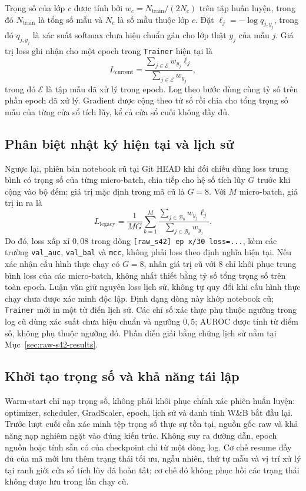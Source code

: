 \documentclass[14pt,a4paper,oneside]{extreport}
\begin{document}
Trọng số của lớp $c$ được tính bởi $w_c=N_{\mathrm{train}}/(2N_c)$
trên tập huấn luyện, trong đó $N_{\mathrm{train}}$ là tổng số mẫu và $N_c$ là số
mẫu thuộc lớp $c$. Đặt $\ell_j=-\log q_{j,y_j}$, trong đó $q_{j,y_j}$
là xác suất softmax chưa hiệu chuẩn gán cho lớp thật $y_j$ của mẫu $j$.
Giá trị loss ghi nhận cho một epoch trong
\texttt{Trainer} hiện tại là
\begin{equation}
 L_{\mathrm{current}}=
 \frac{\sum_{j\in\mathcal E}w_{y_j}\ell_j}{\sum_{j\in\mathcal E}w_{y_j}},
\end{equation}
trong đó $\mathcal E$ là tập mẫu đã xử lý trong epoch. Log theo bước
dùng cùng tỷ số trên phần epoch đã xử lý. Gradient được cộng theo
tử số rồi chia cho tổng trọng số mẫu của từng cửa sổ tích lũy, kể cả
cửa sổ cuối không đầy đủ.

\subsection{Phân biệt nhật ký hiện tại và lịch sử}
Ngược lại, phiên bản notebook cũ tại Git HEAD khi đối chiếu dùng loss trung bình có trọng số
của từng micro-batch, chia tiếp cho hệ số tích lũy $G$ trước khi cộng
vào bộ đếm; giá trị mặc định trong mã cũ là $G=8$.
Với $M$ micro-batch, giá trị in ra là
\begin{equation}
 L_{\mathrm{legacy}}=\frac{1}{MG}\sum_{b=1}^{M}
 \frac{\sum_{j\in\mathcal B_b}w_{y_j}\ell_j}
      {\sum_{j\in\mathcal B_b}w_{y_j}}.
\end{equation}
Do đó, loss xấp xỉ $0{,}08$ trong dòng
\texttt{[raw\_s42] ep x/30 loss=...}, kèm các trường
\texttt{val\_auc}, \texttt{val\_bal} và \texttt{mcc},
không phải loss theo định nghĩa hiện tại. Nếu xác nhận cấu hình thực
chạy có $G=8$, nhân giá trị cũ với 8 chỉ khôi phục trung bình loss của
các micro-batch, không nhất thiết bằng tỷ số tổng trọng số trên toàn
epoch. Luận văn giữ nguyên loss lịch sử, không tự quy đổi khi cấu hình
thực chạy chưa được xác minh độc lập. Định dạng dòng này khớp notebook
cũ; \texttt{Trainer} mới in một từ điển lịch sử. Các chỉ số xác thực
phụ thuộc ngưỡng trong log cũ dùng xác suất chưa hiệu chuẩn và ngưỡng
$0{,}5$; AUROC được tính từ điểm số, không phụ thuộc ngưỡng đó.
Phần diễn giải bằng chứng lịch sử nằm tại Mục~\ref{sec:raw-s42-results}.

\subsection{Khởi tạo trọng số và khả năng tái lập}
Warm-start chỉ nạp trọng số, không phải khôi phục chính xác phiên
huấn luyện: optimizer, scheduler, GradScaler, epoch, lịch sử và danh
tính W\&B bắt đầu lại. Trước lượt cuối cần xác minh tệp trọng số thực
sự tồn tại, nguồn gốc raw và khả năng nạp nghiêm ngặt vào đúng kiến
trúc. Không suy ra đường dẫn, epoch nguồn hoặc tính sẵn có của
checkpoint chỉ từ một dòng log. Cơ chế resume đầy đủ của mã mới lưu
thêm trạng thái tối ưu, ngẫu nhiên, thứ tự mẫu và vị trí xử lý tại
ranh giới cửa sổ tích lũy đã hoàn tất; cơ chế đó không phục hồi các
trạng thái không được lưu trong lần chạy cũ.
\end{document}
